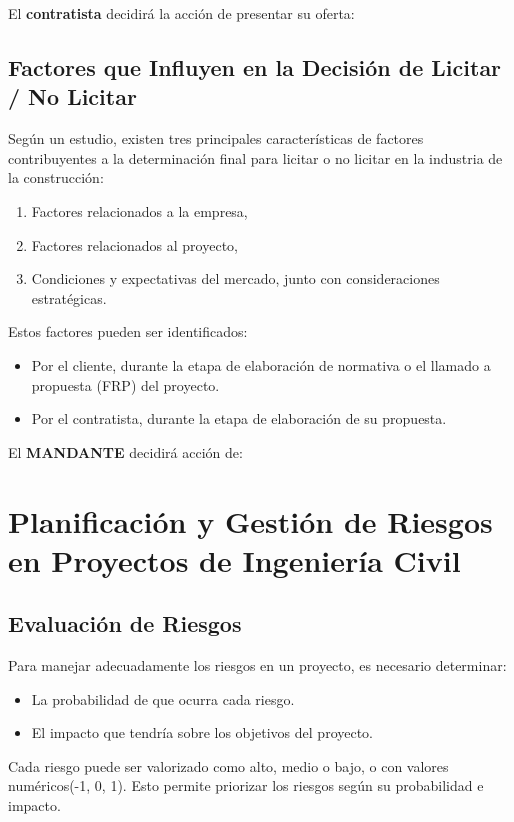 \noindent El \textbf{contratista} decidirá la acción de presentar su oferta:

\begin{center}
\end{center}

\subsection*{Factores que Influyen en la Decisión de Licitar / No Licitar}

\noindent Según un estudio, existen tres principales características de factores contribuyentes a la determinación final para licitar o no licitar en la industria de la construcción:

\begin{enumerate}
    \item Factores relacionados a la empresa,
    \item Factores relacionados al proyecto,
    \item Condiciones y expectativas del mercado, junto con consideraciones estratégicas.
\end{enumerate}

\noindent Estos factores pueden ser identificados:
\begin{itemize}
    \item Por el cliente, durante la etapa de elaboración de normativa o el llamado a propuesta (FRP) del proyecto.
    \item Por el contratista, durante la etapa de elaboración de su propuesta.
\end{itemize}

\noindent El \textbf{MANDANTE} decidirá acción de:
\begin{center}
\end{center}

\newpage
\section{Planificación y Gestión de Riesgos en Proyectos de Ingeniería Civil}

\subsection*{Evaluación de Riesgos}
Para manejar adecuadamente los riesgos en un proyecto, es necesario determinar:
\begin{itemize}
    \item La probabilidad de que ocurra cada riesgo.
    \item El impacto que tendría sobre los objetivos del proyecto.
\end{itemize}
Cada riesgo puede ser valorizado como alto, medio o bajo, o con valores numéricos(-1, 0, 1). Esto permite priorizar los riesgos según su probabilidad e impacto.

